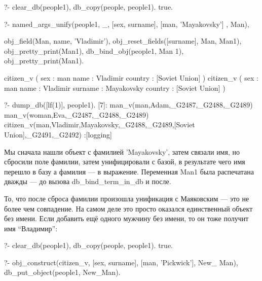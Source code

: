 \documentclass[a4paper]{book}
\begin{document}
\begin{example}{}{}
?- clear_db(people1), db_copy(people, people1).
true.

?- named_args_unify(people1, _, 
      [sex, surname], [man, 'Mayakovsky'] , Man), 

   obj_field(Man, name, 'Vladimir'), 
   obj_reset_fields([surname], Man, Man1), 
   obj_pretty_print(Man1), 
   db_bind_obj(people1, Man 1), 
   obj_pretty_print(Man1).

citizen_v ( 
  sex : man 
  name : Vladimir 
  country : [Soviet Union] 
) 
citizen_v ( 
  sex : man 
  name : Vladimir 
  surname : Mayakovsky 
  country : [Soviet Union] 
) 

?- dump_db([lf(1)], people1).
[7]: man_v(man,Adam,_G2487,_G2488,_G2489) 
man_v(woman,Eva,_G2487,_G2488,_G2489) 
citizen_v(man,Vladimir,Mayakovsky,_G2488,_G2489,[Soviet Union],_G2491,_G2492)                                                        
 :[logging]
\end{example}

Мы сначала нашли объект с фамилией 'Mayakovsky', затем связали
имя, но сбросили поле фамилии, затем унифицировали с базой, в
результате чего имя перешло в базу а фамилия --- в
выражение. Переменная Man1 была распечатана дважды --- до вызова
db\_bind\_term\_in\_db и после.

То, что после сброса фамилии произошла унификация с Маяковским
--- это не более чем совпадение. На самом деле это просто
оказался единственный объект без имени. Если добавить ещё одного
мужчину без имени, то он тоже получит имя ``Владимир'':

\begin{example}{}{}
?- clear_db(people1), db_copy(people, people1).
true.

?- obj_construct(citizen_v, 
      [sex, surname], [man, 'Pickwick'], New_ Man), 
   db_put_object(people1, New_Man).
\end{example}
\end{document}
